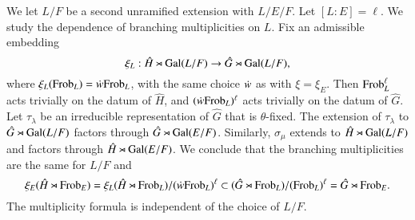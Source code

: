 We let $L/F$ be a second unramified extension with $L/E/F$.  Let
$[L:E]=\ell$.  We study the dependence of branching multiplicities on
$L$.  Fix an admissible embedding
\[
\xi_L:\hat H \rtimes {\operatorname{Gal}}(L/F)\to \hat G \rtimes {\operatorname{Gal}}(L/F),
\]
where $\xi_L({\operatorname{Frob}}_L) = \dot w {\operatorname{Frob}}_L$, with the same choice $\dot w $
as with $\xi = \xi_E$.  Then ${\operatorname{Frob}}_L^\ell$ acts trivially on the
datum of $\hat H$, and $(\dot w {\operatorname{Frob}}_L)^\ell$ acts trivially on the
datum of $\hat G$.  Let $\tau_\lambda$ be an irreducible
representation of $\hat G$ that is $\theta$-fixed.  The extension of
$\tau_\lambda$ to $\hat G\rtimes {\operatorname{Gal}}(L/F)$ factors through $\hat
G\rtimes {\operatorname{Gal}}(E/F)$.  Similarly, $\sigma_\mu$ extends to $\hat
H\rtimes {\operatorname{Gal}}(L/F)$ and factors through $\hat
H\rtimes{\operatorname{Gal}}(E/F)$.  We conclude that the branching multiplicities
are the same for $L/F$ and
\[
\xi_E(\hat H \rtimes {\operatorname{Frob}}_E) 
= \xi_L(\hat H\rtimes {\operatorname{Frob}}_L)/(\dot w {\operatorname{Frob}}_L)^\ell 
\subset (\hat G\rtimes {\operatorname{Frob}}_L)/( {\operatorname{Frob}}_L)^\ell 
= \hat G\rtimes {\operatorname{Frob}}_E.
\]
The multiplicity formula is independent of the choice of $L/F$.


